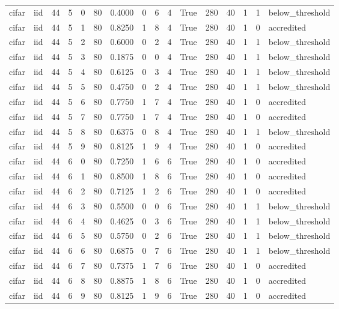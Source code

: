 \begin{tabular}{llrrrrrrrrrrrrrl}
cifar & iid & 44 & 5 & 0 & 80 & 0.4000 & 0 & 6 & 4 & True & 280 & 40 & 1 & 1 & below\_threshold \\
cifar & iid & 44 & 5 & 1 & 80 & 0.8250 & 1 & 8 & 4 & True & 280 & 40 & 1 & 0 & accredited \\
cifar & iid & 44 & 5 & 2 & 80 & 0.6000 & 0 & 2 & 4 & True & 280 & 40 & 1 & 1 & below\_threshold \\
cifar & iid & 44 & 5 & 3 & 80 & 0.1875 & 0 & 0 & 4 & True & 280 & 40 & 1 & 1 & below\_threshold \\
cifar & iid & 44 & 5 & 4 & 80 & 0.6125 & 0 & 3 & 4 & True & 280 & 40 & 1 & 1 & below\_threshold \\
cifar & iid & 44 & 5 & 5 & 80 & 0.4750 & 0 & 2 & 4 & True & 280 & 40 & 1 & 1 & below\_threshold \\
cifar & iid & 44 & 5 & 6 & 80 & 0.7750 & 1 & 7 & 4 & True & 280 & 40 & 1 & 0 & accredited \\
cifar & iid & 44 & 5 & 7 & 80 & 0.7750 & 1 & 7 & 4 & True & 280 & 40 & 1 & 0 & accredited \\
cifar & iid & 44 & 5 & 8 & 80 & 0.6375 & 0 & 8 & 4 & True & 280 & 40 & 1 & 1 & below\_threshold \\
cifar & iid & 44 & 5 & 9 & 80 & 0.8125 & 1 & 9 & 4 & True & 280 & 40 & 1 & 0 & accredited \\
cifar & iid & 44 & 6 & 0 & 80 & 0.7250 & 1 & 6 & 6 & True & 280 & 40 & 1 & 0 & accredited \\
cifar & iid & 44 & 6 & 1 & 80 & 0.8500 & 1 & 8 & 6 & True & 280 & 40 & 1 & 0 & accredited \\
cifar & iid & 44 & 6 & 2 & 80 & 0.7125 & 1 & 2 & 6 & True & 280 & 40 & 1 & 0 & accredited \\
cifar & iid & 44 & 6 & 3 & 80 & 0.5500 & 0 & 0 & 6 & True & 280 & 40 & 1 & 1 & below\_threshold \\
cifar & iid & 44 & 6 & 4 & 80 & 0.4625 & 0 & 3 & 6 & True & 280 & 40 & 1 & 1 & below\_threshold \\
cifar & iid & 44 & 6 & 5 & 80 & 0.5750 & 0 & 2 & 6 & True & 280 & 40 & 1 & 1 & below\_threshold \\
cifar & iid & 44 & 6 & 6 & 80 & 0.6875 & 0 & 7 & 6 & True & 280 & 40 & 1 & 1 & below\_threshold \\
cifar & iid & 44 & 6 & 7 & 80 & 0.7375 & 1 & 7 & 6 & True & 280 & 40 & 1 & 0 & accredited \\
cifar & iid & 44 & 6 & 8 & 80 & 0.8875 & 1 & 8 & 6 & True & 280 & 40 & 1 & 0 & accredited \\
cifar & iid & 44 & 6 & 9 & 80 & 0.8125 & 1 & 9 & 6 & True & 280 & 40 & 1 & 0 & accredited \\

\end{tabular}
